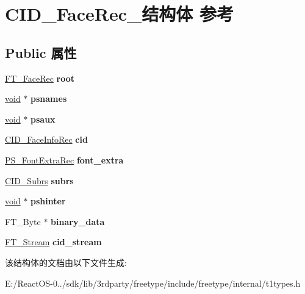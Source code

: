 \hypertarget{struct_c_i_d___face_rec__}{}\section{C\+I\+D\+\_\+\+Face\+Rec\+\_\+结构体 参考}
\label{struct_c_i_d___face_rec__}
\subsection*{Public 属性}
\begin{DoxyCompactItemize}
\item 
\mbox{\label{struct_c_i_d___face_rec___aeeb09d3feaa016b664e1c5bf95a6f232}} 
\hyperlink{struct_f_t___face_rec__}{F\+T\+\_\+\+Face\+Rec} {\bfseries root}
\item 
\mbox{\label{struct_c_i_d___face_rec___ab87e41e70c9aa0c32382ce43dda8b32a}} 
\hyperlink{interfacevoid}{void} $\ast$ {\bfseries psnames}
\item 
\mbox{\label{struct_c_i_d___face_rec___a8e8c0efc67577803cef0f73fc114470d}} 
\hyperlink{interfacevoid}{void} $\ast$ {\bfseries psaux}
\item 
\mbox{\label{struct_c_i_d___face_rec___a00bc02f259a47704eb471d38c573bd4c}} 
\hyperlink{struct_c_i_d___face_info_rec__}{C\+I\+D\+\_\+\+Face\+Info\+Rec} {\bfseries cid}
\item 
\mbox{\label{struct_c_i_d___face_rec___aba208398d42242870890625f993caa81}} 
\hyperlink{struct_p_s___font_extra_rec__}{P\+S\+\_\+\+Font\+Extra\+Rec} {\bfseries font\+\_\+extra}
\item 
\mbox{\label{struct_c_i_d___face_rec___aa842e3eb5a5092dd0fc2c0ecf7bd692b}} 
\hyperlink{struct_c_i_d___subrs_rec__}{C\+I\+D\+\_\+\+Subrs} {\bfseries subrs}
\item 
\mbox{\label{struct_c_i_d___face_rec___a8a367e497f72f4d0384103952d73fc08}} 
\hyperlink{interfacevoid}{void} $\ast$ {\bfseries pshinter}
\item 
\mbox{\label{struct_c_i_d___face_rec___a42f458adc70ad63807dbe63b8b694da2}} 
F\+T\+\_\+\+Byte $\ast$ {\bfseries binary\+\_\+data}
\item 
\mbox{\label{struct_c_i_d___face_rec___a2be5991aa14a8f599c02b1cdfc547e25}} 
\hyperlink{struct_f_t___stream_rec__}{F\+T\+\_\+\+Stream} {\bfseries cid\+\_\+stream}
\end{DoxyCompactItemize}


该结构体的文档由以下文件生成\+:\begin{DoxyCompactItemize}
\item 
E\+:/\+React\+O\+S-\/0../sdk/lib/3rdparty/freetype/include/freetype/internal/t1types.\+h\end{DoxyCompactItemize}
